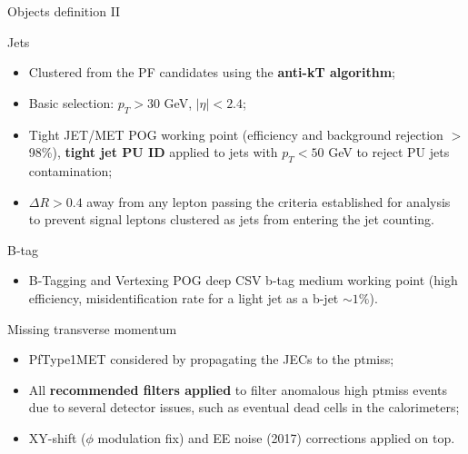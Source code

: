 \documentclass[8pt]{beamer}
\begin{document}
\begin{frame}{Objects definition II}
\justifying
\vspace{5pt} \begin{block}{\centering Jets}\end{block}
\begin{itemize}
\justifying
\item Clustered from the PF candidates using the \textbf{anti-kT algorithm};
\item Basic selection: $p_T > 30$ GeV, $|\eta| < 2.4$;
\item \alert{Tight JET/MET POG working point} (efficiency and background rejection $>$ 98\%), \textbf{tight jet PU ID} applied to jets with $p_T < 50$ GeV to reject PU jets contamination;
\item $\Delta R > 0.4$ away from any lepton passing the criteria established for analysis to prevent signal leptons clustered as jets from entering the jet counting.
\end{itemize} \vfill

\vspace{5pt}
\begin{block}{\centering B-tag}\end{block}
\begin{itemize}
\justifying
\item B-Tagging and Vertexing POG \alert{deep CSV b-tag medium working point} (high efficiency, misidentification rate for a light jet as a b-jet $\sim 1\%$).
\end{itemize} \vfill

\vspace{5pt}
\begin{block}{\centering Missing transverse momentum}\end{block}
\begin{itemize}
\justifying
\item \alert{PfType1MET} considered by propagating the JECs to the ptmiss;
\item All \textbf{recommended filters applied} to filter anomalous high ptmiss events due to several detector issues, such as eventual dead cells in the calorimeters;
\item XY-shift ($\phi$ modulation fix) and EE noise (2017) corrections applied on top.
\end{itemize} \vfill
\end{frame}
\end{document}
